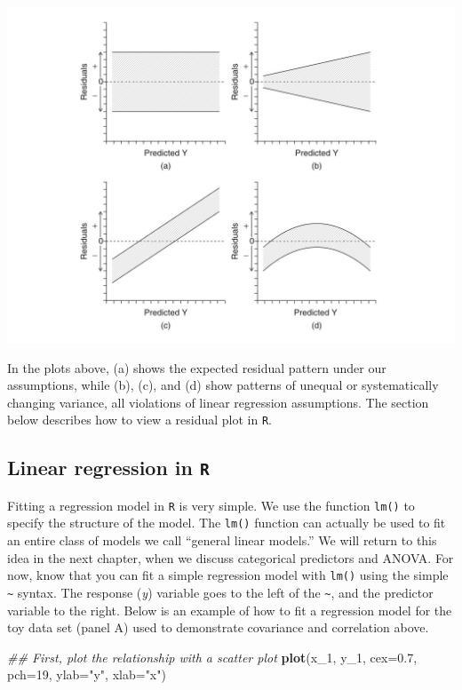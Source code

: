 \documentclass[]{book}
\newenvironment{Shaded}{\begin{snugshade}}{\end{snugshade}}
\newcommand{\CommentTok}[1]{\textcolor[rgb]{0.56,0.35,0.01}{\textit{#1}}}
\newcommand{\DataTypeTok}[1]{\textcolor[rgb]{0.13,0.29,0.53}{#1}}
\newcommand{\DecValTok}[1]{\textcolor[rgb]{0.00,0.00,0.81}{#1}}
\newcommand{\FloatTok}[1]{\textcolor[rgb]{0.00,0.00,0.81}{#1}}
\newcommand{\KeywordTok}[1]{\textcolor[rgb]{0.13,0.29,0.53}{\textbf{#1}}}
\newcommand{\NormalTok}[1]{#1}
\newcommand{\StringTok}[1]{\textcolor[rgb]{0.31,0.60,0.02}{#1}}
\begin{document}
\begin{center}\includegraphics[width=14.22in]{images/images_4b.018} \end{center}

In the plots above, (a) shows the expected residual pattern under our assumptions, while (b), (c), and (d) show patterns of unequal or systematically changing variance, all violations of linear regression assumptions. The section below describes how to view a residual plot in \texttt{R}.

\hypertarget{linear-regression-in-r}{%
\subsection{\texorpdfstring{Linear regression in \texttt{R}}{Linear regression in R}}\label{linear-regression-in-r}}

Fitting a regression model in \texttt{R} is very simple. We use the function \texttt{lm()} to specify the structure of the model. The \texttt{lm()} function can actually be used to fit an entire class of models we call ``general linear models.'' We will return to this idea in the next chapter, when we discuss categorical predictors and ANOVA. For now, know that you can fit a simple regression model with \texttt{lm()} using the simple \texttt{\textasciitilde{}} syntax. The response (\emph{y}) variable goes to the left of the \texttt{\textasciitilde{}}, and the predictor variable to the right. Below is an example of how to fit a regression model for the toy data set (panel A) used to demonstrate covariance and correlation above.

\begin{Shaded}
\begin{Highlighting}[]
\CommentTok{## First, plot the relationship with a scatter plot}
\KeywordTok{plot}\NormalTok{(x_}\DecValTok{1}\NormalTok{, y_}\DecValTok{1}\NormalTok{, }\DataTypeTok{cex=}\FloatTok{0.7}\NormalTok{, }\DataTypeTok{pch=}\DecValTok{19}\NormalTok{, }\DataTypeTok{ylab=}\StringTok{"y"}\NormalTok{, }\DataTypeTok{xlab=}\StringTok{"x"}\NormalTok{)}
\end{Highlighting}
\end{Shaded}
\end{document}
